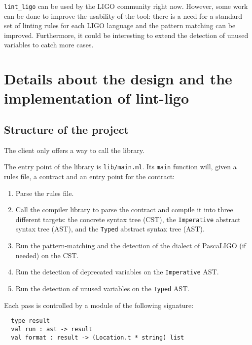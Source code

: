 \documentclass[10pt,a4paper]{article}
\begin{document}
\verb|lint_ligo| can be used by the LIGO community right now.
However, some work can be done to improve the usability of the tool:
there is a need for a standard set of linting rules for each LIGO
language and the pattern matching can be improved. Furthermore, it
could be interesting to extend the detection of unused variables to
catch more cases.


\section{Details about the design and the implementation of lint-ligo}

\subsection{Structure of the project}

The client only offers a way to call the library.

The entry point of the library is \verb|lib/main.ml|. Its \verb|main|
function will, given a rules file, a contract and an entry point for
the contract:

\begin{enumerate}
\item
  Parse the rules file.

\item
  Call the compiler library to parse the contract and compile it into
  three different targets:
  the concrete syntax tree (CST),
  the \verb|Imperative| abstract syntax tree (AST),
  and the \verb|Typed| abstract syntax tree (AST).

\item
  Run the pattern-matching and the detection of the dialect of
  PascaLIGO (if needed) on the CST.

\item
  Run the detection of deprecated variables on the
  \verb|Imperative| AST.

\item
  Run the detection of unused variables on the \verb|Typed| AST.
\end{enumerate}

Each pass is controlled by a module of the following signature:
\begin{verbatim}
  type result
  val run : ast -> result
  val format : result -> (Location.t * string) list
\end{verbatim}
\end{document}

